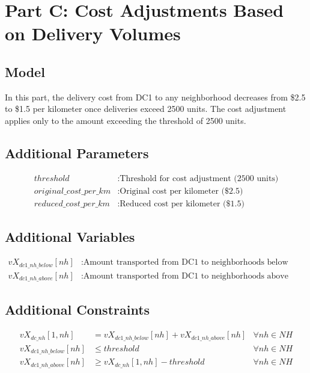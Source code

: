 \documentclass[12pt]{article}
\begin{document}
\section*{Part C: Cost Adjustments Based on Delivery Volumes}
\subsection*{Model}
In this part, the delivery cost from DC1 to any neighborhood decreases from \$2.5 to \$1.5 per kilometer once deliveries exceed 2500 units. The cost adjustment applies only to the amount exceeding the threshold of 2500 units.

\subsection*{Additional Parameters}
\begin{align*}
threshold & : \text{Threshold for cost adjustment (2500 units)} \\
original\_cost\_per\_km & : \text{Original cost per kilometer (\$2.5)} \\
reduced\_cost\_per\_km & : \text{Reduced cost per kilometer (\$1.5)}
\end{align*}

\subsection*{Additional Variables}
\begin{align*}
vX_{dc1\_nh\_below}[nh] & : \text{Amount transported from DC1 to neighborhoods below threshold} \\
vX_{dc1\_nh\_above}[nh] & : \text{Amount transported from DC1 to neighborhoods above threshold}
\end{align*}

\subsection*{Additional Constraints}
\begin{align*}
vX_{dc\_nh}[1, nh] &= vX_{dc1\_nh\_below}[nh] + vX_{dc1\_nh\_above}[nh] & \forall nh \in NH \\
vX_{dc1\_nh\_below}[nh] &\leq threshold & \forall nh \in NH \\
vX_{dc1\_nh\_above}[nh] &\geq vX_{dc\_nh}[1, nh] - threshold & \forall nh \in NH
\end{align*}
\end{document}
